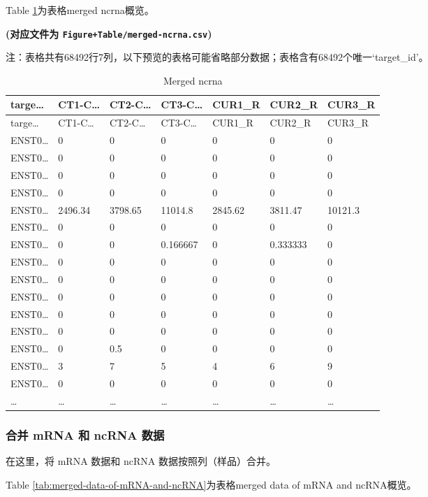\documentclass[
]{article}
\begin{document}
Table \ref{tab:merged-ncrna}为表格merged ncrna概览。

\textbf{(对应文件为 \texttt{Figure+Table/merged-ncrna.csv})}

\begin{center}\begin{tcolorbox}[colback=gray!10, colframe=gray!50, width=0.9\linewidth, arc=1mm, boxrule=0.5pt]注：表格共有68492行7列，以下预览的表格可能省略部分数据；表格含有68492个唯一`target\_id'。
\end{tcolorbox}
\end{center}

\begin{longtable}[]{@{}lllllll@{}}
\caption{\label{tab:merged-ncrna}Merged ncrna}\tabularnewline
\toprule
targe\ldots{} & CT1-C\ldots{} & CT2-C\ldots{} & CT3-C\ldots{} & CUR1\_R & CUR2\_R & CUR3\_R\tabularnewline
\midrule
\endfirsthead
\toprule
targe\ldots{} & CT1-C\ldots{} & CT2-C\ldots{} & CT3-C\ldots{} & CUR1\_R & CUR2\_R & CUR3\_R\tabularnewline
\midrule
\endhead
ENST0\ldots{} & 0 & 0 & 0 & 0 & 0 & 0\tabularnewline
ENST0\ldots{} & 0 & 0 & 0 & 0 & 0 & 0\tabularnewline
ENST0\ldots{} & 0 & 0 & 0 & 0 & 0 & 0\tabularnewline
ENST0\ldots{} & 0 & 0 & 0 & 0 & 0 & 0\tabularnewline
ENST0\ldots{} & 2496.34 & 3798.65 & 11014.8 & 2845.62 & 3811.47 & 10121.3\tabularnewline
ENST0\ldots{} & 0 & 0 & 0 & 0 & 0 & 0\tabularnewline
ENST0\ldots{} & 0 & 0 & 0.166667 & 0 & 0.333333 & 0\tabularnewline
ENST0\ldots{} & 0 & 0 & 0 & 0 & 0 & 0\tabularnewline
ENST0\ldots{} & 0 & 0 & 0 & 0 & 0 & 0\tabularnewline
ENST0\ldots{} & 0 & 0 & 0 & 0 & 0 & 0\tabularnewline
ENST0\ldots{} & 0 & 0 & 0 & 0 & 0 & 0\tabularnewline
ENST0\ldots{} & 0 & 0 & 0 & 0 & 0 & 0\tabularnewline
ENST0\ldots{} & 0 & 0.5 & 0 & 0 & 0 & 0\tabularnewline
ENST0\ldots{} & 3 & 7 & 5 & 4 & 6 & 9\tabularnewline
ENST0\ldots{} & 0 & 0 & 0 & 0 & 0 & 0\tabularnewline
\ldots{} & \ldots{} & \ldots{} & \ldots{} & \ldots{} & \ldots{} & \ldots{}\tabularnewline
\bottomrule
\end{longtable}

\hypertarget{ux5408ux5e76-mrna-ux548c-ncrna-ux6570ux636e}{%
\subsubsection{合并 mRNA 和 ncRNA 数据}\label{ux5408ux5e76-mrna-ux548c-ncrna-ux6570ux636e}}

在这里，将 mRNA 数据和 ncRNA 数据按照列（样品）合并。

Table \ref{tab:merged-data-of-mRNA-and-ncRNA}为表格merged data of mRNA and ncRNA概览。
\end{document}
